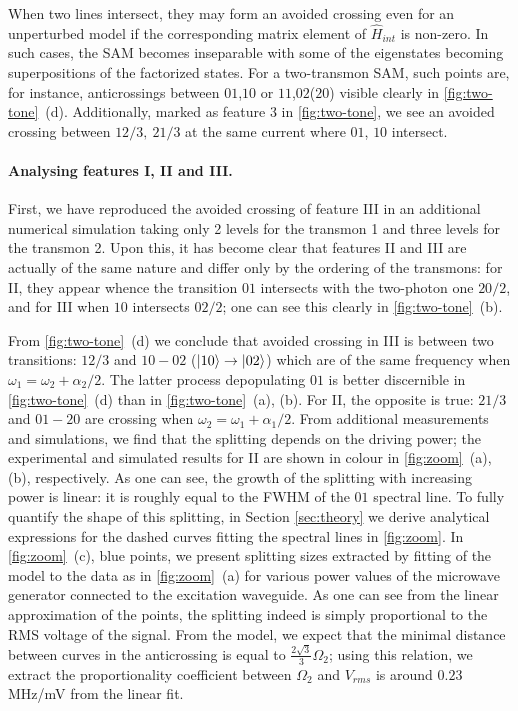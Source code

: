 \documentclass[%
 pra,
 amsmath,amssymb,
 reprint,%
]{revtex4-1}
\begin{document}
When two lines intersect, they may form an 
avoided crossing even for an unperturbed model if 
the corresponding matrix 
element of $\hat H_{int}$ is non-zero. In such 
cases, the SAM becomes inseparable with some of 
the eigenstates becoming superpositions of the 
factorized states. For a two-transmon SAM, such 
points are, for instance, anticrossings between 
${01}$,${10}$ or $ {11} $,$ {02} $($ {20} $) 
visible clearly in \autoref{fig:two-tone}~(d). 
Additionally, marked as feature 3 in 
\autoref{fig:two-tone}, we see an avoided 
crossing between ${12}/3,\ {21}/3$ at the same 
current where ${01}$, ${10}$ intersect.


\paragraph{Analysing features I, II and III.} 
First, we have reproduced the avoided crossing of feature III in an additional numerical simulation taking only 2 levels for the transmon 1 and three levels for 
the transmon 2. Upon this, it has become clear 
that features II and III are actually of 
the same nature and differ only by the ordering 
of the transmons: for II, they appear whence the 
transition ${01}$ intersects with the two-photon 
one ${20/2}$, and for III when ${10}$ intersects ${02/2}$; 
one can see this clearly in 
\autoref{fig:two-tone}~(b).

From \autoref{fig:two-tone}~(d) we conclude that 
avoided crossing in III is between two 
transitions: ${12/3}$ and ${10} - {02}$ 
($\ket{10}\rightarrow\ket{02}$) which are of the 
same frequency when $\omega_1 = 
\omega_2+\alpha_2/2$. The latter process depopulating $01$ is better discernible in \autoref{fig:two-tone}~(d) 
than in \autoref{fig:two-tone}~(a), (b). For II, the 
opposite is true: ${21/3}$ and ${01} - {20}$ are 
crossing when $\omega_2 = \omega_1+\alpha_1/2$. 
From additional measurements and simulations, we 
find that the splitting depends on the driving 
power; the experimental and simulated results for 
II are shown in colour in \autoref{fig:zoom}~(a), (b), respectively. As one can see, the growth of the splitting with 
increasing power is linear: it is roughly equal 
to the FWHM of the ${01}$ spectral line. To fully 
quantify the shape of this splitting, in Section 
\ref{sec:theory} we derive analytical expressions 
for the dashed curves fitting the spectral lines 
in \autoref{fig:zoom}. In \autoref{fig:zoom}~(c), blue points, we present splitting sizes extracted by fitting of the model to the data as in \autoref{fig:zoom}~(a) for various power values of the microwave generator connected to the excitation waveguide. As one can see from the linear approximation of the points, the splitting indeed is simply proportional to the RMS voltage of the signal. From the model, we expect that the minimal distance between curves in the anticrossing is equal to $\frac{2\sqrt{3}}{3} \Omega_2$; using this relation, we extract the proportionality coefficient between $\Omega_2$ and $V_{rms}$ is around $0.23$ MHz/mV from the linear fit.
\end{document}
